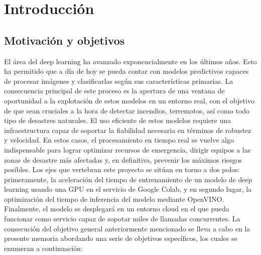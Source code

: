 \cleardoublepage


\chapter{Introducción}
\label{ch:chapter1}


\section{Motivación y objetivos}\label{sec:motivación-y-objetivos}

El área del deep learning ha avanzado exponencialmente en los últimos años.
Esto ha permitido que a día de hoy se pueda contar con modelos predictivos capaces de procesar imágenes y clasificarlas según sus características primarias.
La consecuencia principal de este proceso es la apertura de una ventana de oportunidad a la explotación de estos modelos en un entorno real, con el objetivo de que sean cruciales a
la hora de detectar incendios, terremotos, así como todo tipo de desastres naturales.
El uso eficiente de estos modelos requiere una infraestructura capaz de soportar la fiabilidad necesaria en términos de robustez y velocidad.
En estos casos, el procesamiento en tiempo real se vuelve algo indispensable para lograr optimizar recursos de emergencia, dirigir equipos a las zonas de desastre más afectadas y, en definitiva, prevenir los máximos riesgos posibles.
Los ejes que vertebran este proyecto se sitúan en torno a dos polos: primeramente, la aceleración del tiempo de entrenamiento de un modelo de deep learning usando una GPU en el
servicio de Google Colab, y en segundo lugar, la optimización del tiempo de inferencia del modelo mediante OpenVINO.
Finalmente, el modelo se desplegará en un entorno cloud en el que pueda funcionar como servicio capaz de sopotar miles de llamadas concurrentes.
La consecución del objetivo general anteriormente mencionado se lleva a cabo en la presente memoria abordando una serie de objetivos específicos, los cuales se enumeran a
continuación:
